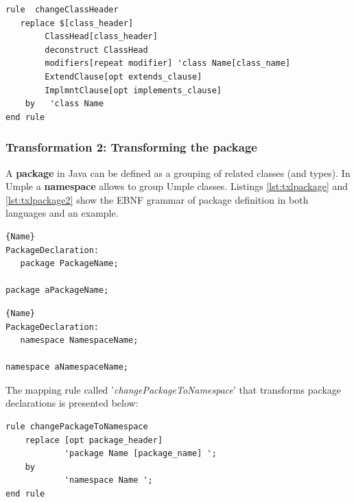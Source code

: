\begin{lstlisting}[style=umplePlain, caption=TXL Mapping rule for transforming the class headers, label=lst:classHeader]
rule  changeClassHeader 	
   replace $[class_header] 		
    	ClassHead[class_header] 		
    	deconstruct ClassHead 					
    	modifiers[repeat modifier] 'class Name[class_name] 
        ExtendClause[opt extends_clause] 
        ImplmntClause[opt implements_clause]          
    by 	 'class Name 
end rule

\end{lstlisting}

\subsubsection{Transformation 2: Transforming the package} 

A \textbf{package} in Java can be defined as a grouping of related classes (and types). In Umple a \textbf{namespace} allows to group Umple classes. Listings \ref{lst:txlpackage} and \ref{lst:txlpackage2} show the EBNF grammar of package definition in both languages and an example. 

\noindent\begin{minipage}{.45\textwidth}
\begin{lstlisting}[style=umplePlain,caption=Java Package,label=lst:txlpackage]{Name}
PackageDeclaration:
   package PackageName; 

package aPackageName;
\end{lstlisting}
\end{minipage}\hfill
\begin{minipage}{.45\textwidth}
\begin{lstlisting}[style=umplePlain,caption=Umple Namespace,label=lst:txlpackage2]{Name}
PackageDeclaration:
   namespace NamespaceName;
 
namespace aNamespaceName;
\end{lstlisting}
\end{minipage}


The mapping rule called '\textit{changePackageToNamespace}' that transforms package declarations is presented below:

\begin{lstlisting}[style=umplePlain, label=lst:packageDeclRule3, caption=TXL mapping rule for the transformation of the package declaration]
rule changePackageToNamespace 
    replace [opt package_header]      
            'package Name [package_name] '; 
    by       
            'namespace Name '; 
end rule	
\end{lstlisting}

